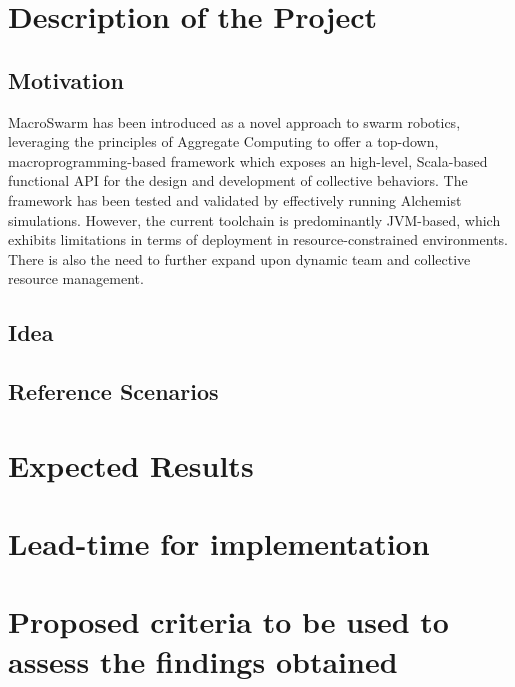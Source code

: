 \documentclass[12pt]{article}
\begin{document}
\newpage
\section{Description of the Project}
\subsection{Motivation}
MacroSwarm has been introduced as a novel approach to swarm robotics, leveraging the principles of Aggregate Computing to offer a top-down, macroprogramming-based framework 
which exposes an high-level, Scala-based functional API for the design and development of collective behaviors.
The framework has been tested and validated by effectively running Alchemist\cite{pianini2013chemical} simulations.
However, the current toolchain is predominantly JVM-based, which exhibits limitations in terms of deployment in resource-constrained environments. There is also the need
to further expand upon dynamic team and collective resource management.

\subsection{Idea}

\subsection{Reference Scenarios}

\newpage
\section{Expected Results}

\newpage
\section{Lead-time for implementation}

\newpage
\section{Proposed criteria to be used to assess the findings obtained}

\clearpage

\renewcommand{\refname}{References}



\end{document}
